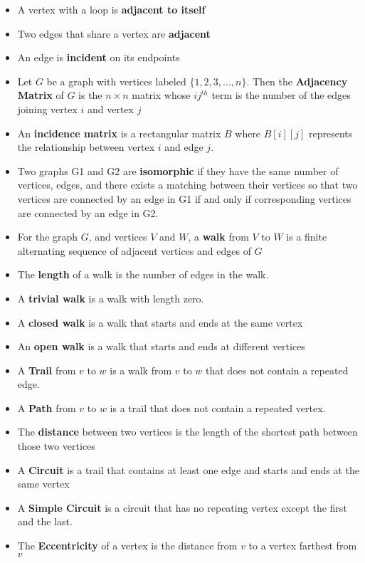 \documentclass{report}
\begin{document}
\begin{itemize}
        \item A vertex with a loop is \textbf{adjacent to itself}
        \item  Two edges that share a vertex are \textbf{adjacent}
        \item An edge is \textbf{incident} on its endpoints
        \item Let $G $ be a graph with vertices labeled $\{1,2,3,...,n\} $. Then the \textbf{Adjacency Matrix} of $G$ is the $n \times n$ matrix whose $ij^{th}$ term is the number of the edges joining vertex $i $ and vertex $j $
        \item An \textbf{incidence matrix} is a rectangular matrix \( B \) where \( B[i][j] \) represents the relationship between vertex \( i \) and edge \( j \).
        \item Two graphs G1 and G2 are \textbf{isomorphic} if they have the same number of vertices, edges, and there exists a matching between their vertices so that two vertices are connected by an edge in G1 if and only if corresponding vertices are connected by an edge in G2.
        \item For the graph $G$, and vertices $V$ and $W$, a \textbf{walk} from $V$ to $W$ is a finite alternating sequence of adjacent vertices and edges of $G$ 
        \item The \textbf{length} of a walk is the number of edges in the walk. 
        \item A \textbf{trivial walk} is a walk with length zero.
        \item A \textbf{closed walk} is a walk that starts and ends at the same vertex
        \item An \textbf{open walk} is a walk that starts and ends at different vertices 
        \item A \textbf{Trail} from $v$ to $w$ is a walk from $v$ to $w$ that does not contain a repeated edge.
        \item A \textbf{Path}  from $v$ to $w$ is a trail that does not contain a repeated vertex.
        \item The \textbf{distance} between two vertices is the length of the shortest path between those two vertices
        \item A \textbf{Circuit}  is a trail that contains at least one edge and starts and ends at the same vertex
        \item A \textbf{Simple Circuit} is a circuit that has no repeating vertex except the first and the last.  
        \item The \textbf{Eccentricity} of a vertex is the distance from $v$ to a vertex farthest from $v$

\end{itemize}
\end{document}
